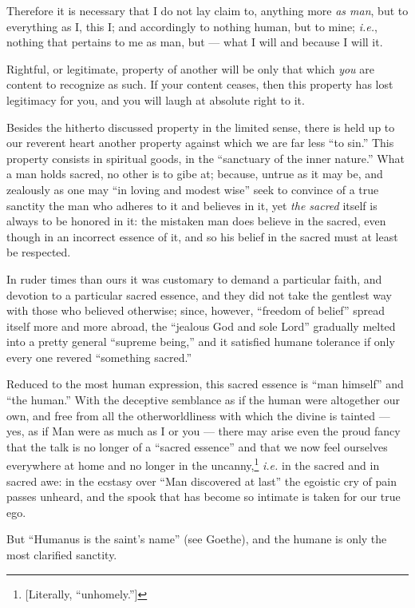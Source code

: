 Therefore it is necessary that I do not lay claim to, anything more \textit{as 
man}, but to everything as I, this I; and accordingly to nothing human, but to 
mine; \textit{i.e.}, nothing that pertains to me as man, but --- what I will 
and because I will it.

Rightful, or legitimate, property of another will be only that which 
\textit{you} are content to recognize as such. If your content ceases, then 
this property has lost legitimacy for you, and you will laugh at absolute 
right to it.

Besides the hitherto discussed property in the limited sense, there is held up 
to our reverent heart another property against which we are far less ``to 
sin.'' This property consists in spiritual goods, in the ``sanctuary of the 
inner nature.'' What a man holds sacred, no other is to gibe at; because, 
untrue as it may be, and zealously as one may ``in loving and modest wise'' 
seek to convince of a true sanctity the man who adheres to it and believes in 
it, yet \textit{the sacred} itself is always to be honored in it: the mistaken 
man does believe in the sacred, even though in an incorrect essence of it, and 
so his belief in the sacred must at least be respected.

In ruder times than ours it was customary to demand a particular faith, and 
devotion to a particular sacred essence, and they did not take the gentlest 
way with those who believed otherwise; since, however, ``freedom of belief'' 
spread itself more and more abroad, the ``jealous God and sole Lord'' 
gradually melted into a pretty general ``supreme being,'' and it satisfied 
humane tolerance if only every one revered ``something sacred.''

Reduced to the most human expression, this sacred essence is ``man himself'' 
and ``the human.'' With the deceptive semblance as if the human were 
altogether our own, and free from all the otherworldliness with which the 
divine is tainted --- yes, as if Man were as much as I or you --- there may 
arise even the proud fancy that the talk is no longer of a ``sacred 
essence'' and that we now feel ourselves everywhere at home and no longer in 
the uncanny,\footnote{[Literally, ``unhomely.'']} \textit{i.e.} in the 
sacred and in sacred awe: in the ecstasy over ``Man discovered at last'' the 
egoistic cry of pain passes unheard, and the spook that has become so intimate 
is taken for our true ego.

But ``Humanus is the saint's name'' (see Goethe), and the humane is only the 
most clarified sanctity.

